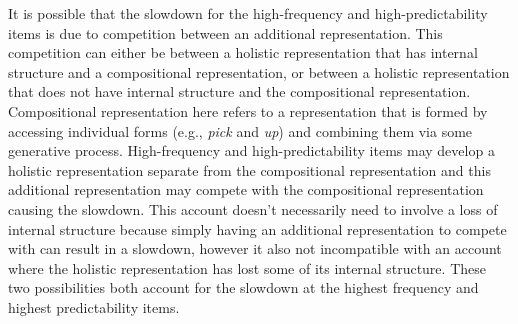 \documentclass[
  12pt,
  letterpaper,
]{scrreport}
\begin{document}
It is possible that the slowdown for the high-frequency and
high-predictability items is due to competition between an additional
representation. This competition can either be between a holistic
representation that has internal structure and a compositional
representation, or between a holistic representation that does not have
internal structure and the compositional representation. Compositional
representation here refers to a representation that is formed by
accessing individual forms (e.g., \emph{pick} and \emph{up}) and
combining them via some generative process. High-frequency and
high-predictability items may develop a holistic representation separate
from the compositional representation and this additional representation
may compete with the compositional representation causing the slowdown.
This account doesn't necessarily need to involve a loss of internal
structure because simply having an additional representation to compete
with can result in a slowdown, however it also not incompatible with an
account where the holistic representation has lost some of its internal
structure. These two possibilities both account for the slowdown at the
highest frequency and highest predictability items.
\end{document}
